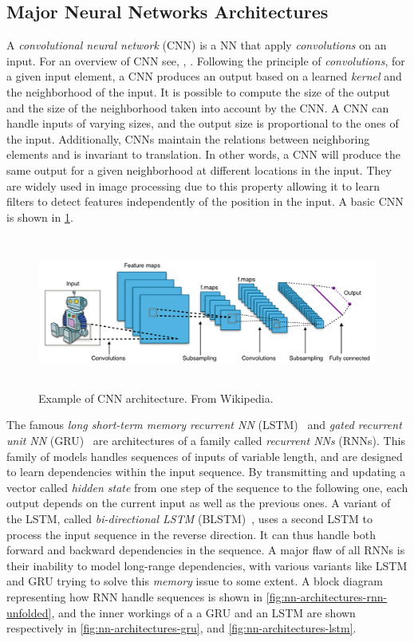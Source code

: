 \subsection{Major Neural Networks Architectures}
A \textit{convolutional neural network} (CNN) is a NN that apply \textit{convolutions} on an input. For an overview of CNN see, \eg, \cite{cnn-overview:2018:yamashita}.
Following the principle of \textit{convolutions}, for a given input element, a CNN produces an output based on a learned \textit{kernel} and the neighborhood of the input. It is possible to compute the size of the output and the size of the neighborhood taken into account by the CNN.
A CNN can handle inputs of varying sizes, and the output size is proportional to the ones of the input.
Additionally, CNNs maintain the relations between neighboring elements and is invariant to translation.
In other words, a CNN will produce the same output for a given neighborhood at different locations in the input.
They are widely used in image processing due to this property allowing it to learn filters to detect features independently of the position in the input.
A basic CNN is shown in \cref{fig:nn-architectures-cnn}.

\begin{figure}
    \centering
    \includegraphics[keepaspectratio, width=.9\textwidth, height=5cm]{Figures/Ch0/cnn.png}
    \caption{Example of CNN architecture. From Wikipedia.}
    \label{fig:nn-architectures-cnn}
\end{figure}

The famous \textit{long short-term memory recurrent NN} (LSTM)~\cite{blstm:2005:graves} and \textit{gated recurrent unit NN} (GRU)~\cite{gru:2014:cho} are architectures of a family called \textit{recurrent NNs} (RNNs).
This family of models handles sequences of inputs of variable length, and are designed to learn dependencies within the input sequence.
By transmitting and updating a vector called \textit{hidden state} from one step of the sequence to the following one, each output depends on the current input as well as the previous ones.
A variant of the LSTM, called \textit{bi-directional LSTM} (BLSTM)~\cite{blstm:2005:graves}, uses a second LSTM to process the input sequence in the reverse direction. It can thus handle both forward and backward dependencies in the sequence.
A major flaw of all RNNs is their inability to model long-range dependencies, with various variants like LSTM and GRU trying to solve this \textit{memory} issue to some extent.
A block diagram representing how RNN handle sequences is shown in \cref{fig:nn-architectures-rnn-unfolded}, and the inner workings of a a GRU and an LSTM are shown respectively in \cref{fig:nn-architectures-gru}, and \cref{fig:nn-architectures-lstm}.


